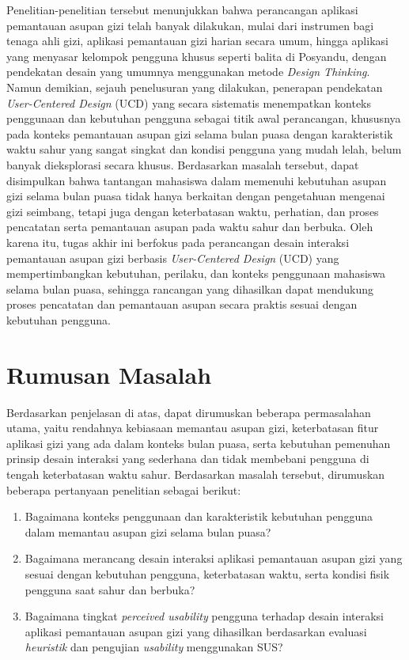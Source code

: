 Penelitian-penelitian tersebut menunjukkan bahwa perancangan aplikasi pemantauan asupan gizi telah banyak dilakukan, mulai dari instrumen bagi tenaga ahli gizi, aplikasi pemantauan gizi harian secara umum, hingga aplikasi yang menyasar kelompok pengguna khusus seperti balita di Posyandu, dengan pendekatan desain yang umumnya menggunakan metode \emph{Design Thinking}. Namun demikian, sejauh penelusuran yang dilakukan, penerapan pendekatan \emph{User-Centered Design} (UCD) yang secara sistematis menempatkan konteks penggunaan dan kebutuhan pengguna sebagai titik awal perancangan, khususnya pada konteks pemantauan asupan gizi selama bulan puasa dengan karakteristik waktu sahur yang sangat singkat dan kondisi pengguna yang mudah lelah, belum banyak dieksplorasi secara khusus. Berdasarkan masalah tersebut, dapat disimpulkan bahwa tantangan mahasiswa dalam memenuhi kebutuhan asupan gizi selama bulan puasa tidak hanya berkaitan dengan pengetahuan mengenai gizi seimbang, tetapi juga dengan keterbatasan waktu, perhatian, dan proses pencatatan serta pemantauan asupan pada waktu sahur dan berbuka. Oleh karena itu, tugas akhir ini berfokus pada perancangan desain interaksi pemantauan asupan gizi berbasis \emph{User-Centered Design} (UCD) yang mempertimbangkan kebutuhan, perilaku, dan konteks penggunaan mahasiswa selama bulan puasa, sehingga rancangan yang dihasilkan dapat mendukung proses pencatatan dan pemantauan asupan secara praktis sesuai dengan kebutuhan pengguna.
\section{Rumusan Masalah}
Berdasarkan penjelasan di atas, dapat dirumuskan beberapa permasalahan utama, yaitu rendahnya kebiasaan memantau asupan gizi, keterbatasan fitur aplikasi gizi yang ada dalam konteks bulan puasa, serta kebutuhan pemenuhan prinsip desain interaksi yang sederhana dan tidak membebani pengguna di tengah keterbatasan waktu sahur. Berdasarkan masalah tersebut, dirumuskan beberapa pertanyaan penelitian sebagai berikut:
\begin{enumerate}
    \item Bagaimana konteks penggunaan dan karakteristik kebutuhan pengguna dalam memantau asupan gizi selama bulan puasa?
    \item Bagaimana merancang desain interaksi aplikasi pemantauan asupan gizi yang sesuai dengan kebutuhan pengguna, keterbatasan waktu, serta kondisi fisik pengguna saat sahur dan berbuka?
    \item Bagaimana tingkat \textit{perceived usability} pengguna terhadap desain interaksi aplikasi pemantauan asupan gizi yang dihasilkan berdasarkan evaluasi \textit{heuristik} dan pengujian \textit{usability} menggunakan SUS?
\end{enumerate}

